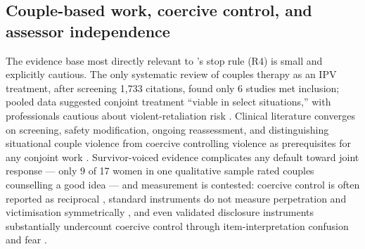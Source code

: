 \subsection{Couple-based work, coercive control, and assessor independence}
The evidence base most directly relevant to \tphe{}'s stop rule (R4) is small and explicitly cautious. The only systematic review of couples therapy as an IPV treatment, after screening 1{,}733 citations, found only 6 studies met inclusion; pooled data suggested conjoint treatment ``viable in select situations,'' with professionals cautious about violent-retaliation risk \cite{ref45}. Clinical literature converges on screening, safety modification, ongoing reassessment, and distinguishing situational couple violence from coercive controlling violence as prerequisites for any conjoint work \cite{ref46,ref47}. Survivor-voiced evidence complicates any default toward joint response --- only 9 of 17 women in one qualitative sample rated couples counselling a good idea \cite{ref48} --- and measurement is contested: coercive control is often reported as reciprocal \cite{ref49}, standard instruments do not measure perpetration and victimisation symmetrically \cite{ref50}, and even validated disclosure instruments substantially undercount coercive control through item-interpretation confusion and fear \cite{ref51}.


